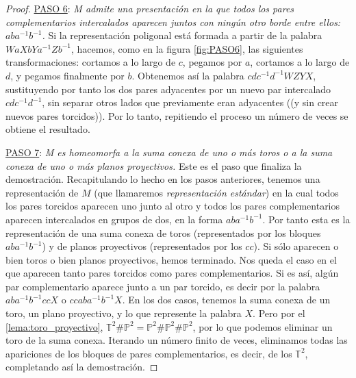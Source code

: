 \documentclass[10pt]{report}
\newcommand{\Toro}{\mathbb{T}^2}
\newcommand{\Proyectivo}{\mathbb{P}^2}
\theoremstyle{definition}
\begin{document}
\begin{proof}
\underline{PASO 6}: \textit{M admite una presentación en la que todos los pares complementarios intercalados aparecen juntos con ningún otro borde entre ellos: $aba^{-1}b^{-1}$.} Si la representación poligonal está formada a partir de la palabra $WaXbYa^{-1}Zb^{-1}$, hacemos, como en la figura \autoref{fig:PASO6}, las siguientes transformaciones: cortamos a lo largo de $c$, pegamos por $a$, cortamos a lo largo de $d$, y pegamos finalmente por $b$. Obtenemos así la palabra $cdc^{-1}d^{-1}WZYX$, sustituyendo por tanto los dos pares adyacentes por un nuevo par intercalado $cdc^{-1}d^{-1}$, sin separar otros lados que previamente eran adyacentes ((y sin crear nuevos pares torcidos)). Por lo tanto, repitiendo el proceso un número de veces se obtiene el resultado.

\underline{PASO 7}: \textit{M es homeomorfa a la suma conexa de uno o más toros o a la suma conexa de uno o más planos proyectivos.} Este es el paso que finaliza la demostración.  Recapitulando lo hecho en los pasos anteriores, tenemos una representación de $M$ (que llamaremos \textit{representación estándar}) en la cual todos los pares torcidos aparecen uno junto al otro y todos los pares complementarios aparecen intercalados en grupos de dos, en la forma $aba^{-1}b^{-1}$. Por tanto esta es la representación de una suma conexa de toros (representados por los bloques $aba^{-1}b^{-1}$) y de planos proyectivos (representados por los $cc$). Si sólo aparecen o bien toros o bien planos proyectivos, hemos terminado.
Nos queda el caso en el que aparecen tanto pares torcidos como pares complementarios. Si es así, algún par complementario aparece junto a un par torcido, es decir por la palabra $aba^{-1}b^{-1}ccX$ o $ccaba^{-1}b^{-1}X$. En los dos casos, tenemos la suma conexa de un toro, un plano proyectivo, y lo que represente la palabra $X$. Pero por el \autoref{lema:toro_proyectivo}, $\Toro \# \Proyectivo = \Proyectivo \# \Proyectivo \# \Proyectivo$, por lo que podemos eliminar un toro de la suma conexa. Iterando un número finito de veces, eliminamos todas las apariciones de los bloques de pares complementarios, es decir, de los $\Toro$, completando así la demostración.
\end{proof}

\clearpage
\end{document}
